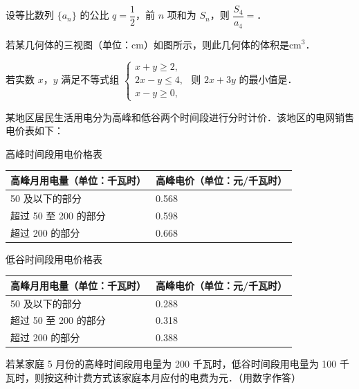\begin{question}
设等比数列 $\{a_n\}$ 的公比 $q=\dfrac12$，前 $n$ 项和为 $S_n$，则 $\dfrac{S_4}{a_4}=$\gkblank{}．

\Needspace{0.4\textheight}
\end{question}
\begingroup
\renewenvironment{question}{\Needspace{0.5\textheight}}{}
\begin{question}
若某几何体的三视图（单位：cm）如图所示，则此几何体的体积是\gkblank{}$\mathrm{cm^3}$．
\nopagebreak[4]
\begin{center}\end{center}
\nopagebreak[4]
\end{question}
\endgroup
\begin{question}
若实数 $x$，$y$ 满足不等式组 $\begin{cases}x+y\geqslant2,\\2x-y\leqslant4,\\x-y\geqslant0,\end{cases}$ 则 $2x+3y$ 的最小值是\gkblank{}．

\end{question}
\begin{question}
某地区居民生活用电分为高峰和低谷两个时间段进行分时计价．该地区的电网销售电价表如下：

高峰时间段用电价格表

\begin{center}
\begin{tabular}{ll}
\toprule
高峰月用电量（单位：千瓦时） & 高峰电价（单位：元/千瓦时） \\
\midrule
50 及以下的部分 & 0.568 \\
超过 50 至 200 的部分 & 0.598 \\
超过 200 的部分 & 0.668 \\
\bottomrule
\end{tabular}
\end{center}

低谷时间段用电价格表

\begin{center}
\begin{tabular}{ll}
\toprule
高峰月用电量（单位：千瓦时） & 高峰电价（单位：元/千瓦时） \\
\midrule
50 及以下的部分 & 0.288 \\
超过 50 至 200 的部分 & 0.318 \\
超过 200 的部分 & 0.388 \\
\bottomrule
\end{tabular}
\end{center}

若某家庭 5 月份的高峰时间段用电量为 200 千瓦时，低谷时间段用电量为 100 千瓦时，则按这种计费方式该家庭本月应付的电费为\gkblank{}元．（用数字作答）

\end{question}
